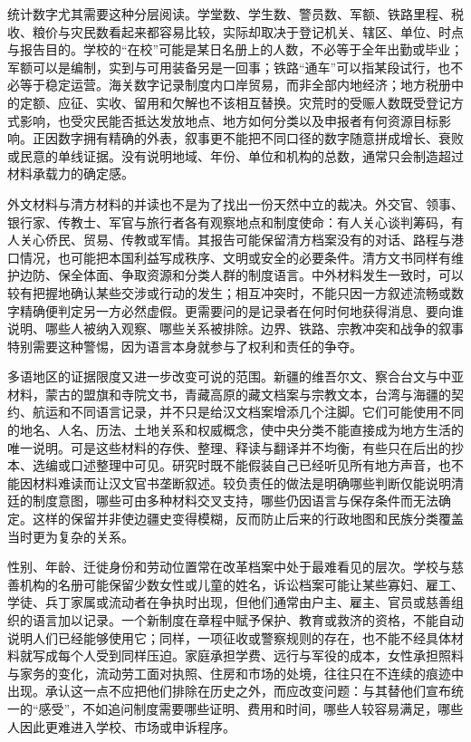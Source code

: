 统计数字尤其需要这种分层阅读。学堂数、学生数、警员数、军额、铁路里程、税收、粮价与灾民数看起来都容易比较，实际却取决于登记机关、辖区、单位、时点与报告目的。学校的“在校”可能是某日名册上的人数，不必等于全年出勤或毕业；军额可以是编制，实到与可用装备另是一回事；铁路“通车”可以指某段试行，也不必等于稳定运营。海关数字记录制度内口岸贸易，而非全部内地经济；地方税册中的定额、应征、实收、留用和欠解也不该相互替换。灾荒时的受赈人数既受登记方式影响，也受灾民能否抵达发放地点、地方如何分类以及申报者有何资源目标影响。正因数字拥有精确的外表，叙事更不能把不同口径的数字随意拼成增长、衰败或民意的单线证据。没有说明地域、年份、单位和机构的总数，通常只会制造超过材料承载力的确定感。

外文材料与清方材料的并读也不是为了找出一份天然中立的裁决。外交官、领事、银行家、传教士、军官与旅行者各有观察地点和制度使命：有人关心谈判筹码，有人关心侨民、贸易、传教或军情。其报告可能保留清方档案没有的对话、路程与港口情况，也可能把本国利益写成秩序、文明或安全的必要条件。清方文书同样有维护边防、保全体面、争取资源和分类人群的制度语言。中外材料发生一致时，可以较有把握地确认某些交涉或行动的发生；相互冲突时，不能只因一方叙述流畅或数字精确便判定另一方必然虚假。更需要问的是记录者在何时何地获得消息、要向谁说明、哪些人被纳入观察、哪些关系被排除。边界、铁路、宗教冲突和战争的叙事特别需要这种警惕，因为语言本身就参与了权利和责任的争夺。

多语地区的证据限度又进一步改变可说的范围。新疆的维吾尔文、察合台文与中亚材料，蒙古的盟旗和寺院文书，青藏高原的藏文档案与宗教文本，台湾与海疆的契约、航运和不同语言记录，并不只是给汉文档案增添几个注脚。它们可能使用不同的地名、人名、历法、土地关系和权威概念，使中央分类不能直接成为地方生活的唯一说明。可是这些材料的存佚、整理、释读与翻译并不均衡，有些只在后出的抄本、选编或口述整理中可见。研究时既不能假装自己已经听见所有地方声音，也不能因材料难读而让汉文官书垄断叙述。较负责任的做法是明确哪些判断仅能说明清廷的制度意图，哪些可由多种材料交叉支持，哪些仍因语言与保存条件而无法确定。这样的保留并非使边疆史变得模糊，反而防止后来的行政地图和民族分类覆盖当时更为复杂的关系。

性别、年龄、迁徙身份和劳动位置常在改革档案中处于最难看见的层次。学校与慈善机构的名册可能保留少数女性或儿童的姓名，诉讼档案可能让某些寡妇、雇工、学徒、兵丁家属或流动者在争执时出现，但他们通常由户主、雇主、官员或慈善组织的语言加以记录。一个新制度在章程中赋予保护、教育或救济的资格，不能自动说明人们已经能够使用它；同样，一项征收或警察规则的存在，也不能不经具体材料就写成每个人受到同样压迫。家庭承担学费、远行与军役的成本，女性承担照料与家务的变化，流动劳工面对执照、住房和市场的处境，往往只在不连续的痕迹中出现。承认这一点不应把他们排除在历史之外，而应改变问题：与其替他们宣布统一的“感受”，不如追问制度需要哪些证明、费用和时间，哪些人较容易满足，哪些人因此更难进入学校、市场或申诉程序。

